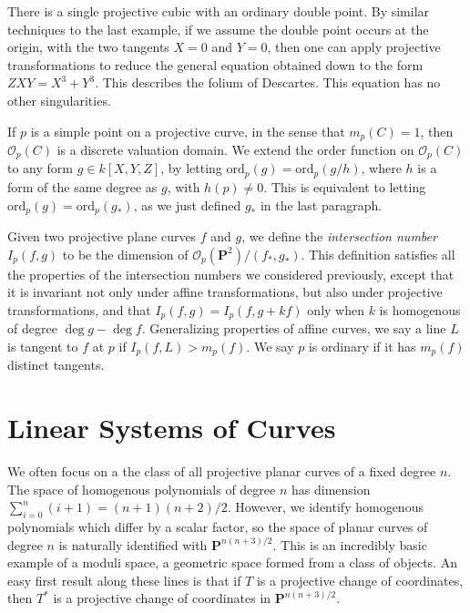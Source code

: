 \begin{example}
    There is a single projective cubic with an ordinary double point. By similar techniques to the last example, if we assume the double point occurs at the origin, with the two tangents $X = 0$ and $Y = 0$, then one can apply projective transformations to reduce the general equation obtained down to the form $ZXY = X^3 + Y^3$. This describes the folium of Descartes. This equation has no other singularities.
\end{example}

If $p$ is a simple point on a projective curve, in the sense that $m_p(C) = 1$, then $\mathcal{O}_p(C)$ is a discrete valuation domain. We extend the order function on $\mathcal{O}_p(C)$ to any form $g \in k[X,Y,Z]$, by letting $\text{ord}_p(g) = \text{ord}_p(g/h)$, where $h$ is a form of the same degree as $g$, with $h(p) \neq 0$. This is equivalent to letting $\text{ord}_p(g) = \text{ord}_p(g_*)$, as we just defined $g_*$ in the last paragraph.

Given two projective plane curves $f$ and $g$, we define the \emph{intersection number} $I_p(f,g)$ to be the dimension of $\mathcal{O}_p(\mathbf{P}^2)/(f_*,g_*)$. This definition satisfies all the properties of the intersection numbers we considered previously, except that it is invariant not only under affine transformations, but also under projective transformations, and that $I_p(f,g) = I_p(f,g + kf)$ only when $k$ is homogenous of degree $\deg g - \deg f$. Generalizing properties of affine curves, we say a line $L$ is tangent to $f$ at $p$ if $I_p(f,L) > m_p(f)$. We say $p$ is ordinary if it has $m_p(f)$ distinct tangents.

\section{Linear Systems of Curves}

We often focus on a the class of all projective planar curves of a fixed degree $n$. The space of homogenous polynomials of degree $n$ has dimension $\sum_{i = 0}^n (i+1) = (n+1)(n+2)/2$. However, we identify homogenous polynomials which differ by a scalar factor, so the space of planar curves of degree $n$ is naturally identified with $\mathbf{P}^{n(n+3)/2}$. This is an incredibly basic example of a moduli space, a geometric space formed from a class of objects. An easy first result along these lines is that if $T$ is a projective change of coordinates, then $T^*$ is a projective change of coordinates in $\mathbf{P}^{n(n+3)/2}$.

